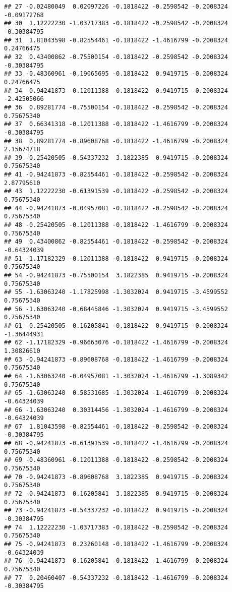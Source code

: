 \documentclass[
]{article}
\begin{document}
\begin{verbatim}
## 27 -0.02480049  0.02097226 -0.1818422 -0.2598542 -0.2008324 -0.09172768
## 30  1.12222230 -1.03717383 -0.1818422 -0.2598542 -0.2008324 -0.30384795
## 31  1.81043598 -0.82554461 -0.1818422 -1.4616799 -0.2008324  0.24766475
## 32  0.43400862 -0.75500154 -0.1818422 -0.2598542 -0.2008324 -0.30384795
## 33 -0.48360961 -0.19065695 -0.1818422  0.9419715 -0.2008324  0.24766475
## 34 -0.94241873 -0.12011388 -0.1818422  0.9419715 -0.2008324 -2.42505066
## 36  0.89281774 -0.75500154 -0.1818422 -0.2598542 -0.2008324  0.75675340
## 37  0.66341318 -0.12011388 -0.1818422 -1.4616799 -0.2008324 -0.30384795
## 38  0.89281774 -0.89608768 -0.1818422 -1.4616799 -0.2008324  2.15674718
## 39 -0.25420505 -0.54337232  3.1822385  0.9419715 -0.2008324  0.75675340
## 41 -0.94241873 -0.82554461 -0.1818422 -0.2598542 -0.2008324  2.87795610
## 43  1.12222230 -0.61391539 -0.1818422 -0.2598542 -0.2008324  0.75675340
## 44 -0.94241873 -0.04957081 -0.1818422 -0.2598542 -0.2008324  0.75675340
## 48 -0.25420505 -0.12011388 -0.1818422 -1.4616799 -0.2008324  0.75675340
## 49  0.43400862 -0.82554461 -0.1818422 -0.2598542 -0.2008324 -0.64324039
## 51 -1.17182329 -0.12011388 -0.1818422  0.9419715 -0.2008324  0.75675340
## 54 -0.94241873 -0.75500154  3.1822385  0.9419715 -0.2008324  0.75675340
## 55 -1.63063240 -1.17825998 -1.3032024  0.9419715 -3.4599552  0.75675340
## 56 -1.63063240 -0.68445846 -1.3032024  0.9419715 -3.4599552  0.75675340
## 61 -0.25420505  0.16205841 -0.1818422  0.9419715 -0.2008324 -1.36444931
## 62 -1.17182329 -0.96663076 -0.1818422 -1.4616799 -0.2008324  1.30826610
## 63 -0.94241873 -0.89608768 -0.1818422 -1.4616799 -0.2008324  0.75675340
## 64 -1.63063240 -0.04957081 -1.3032024 -1.4616799 -1.3089342  0.75675340
## 65 -1.63063240  0.58531685 -1.3032024 -1.4616799 -0.2008324 -0.64324039
## 66 -1.63063240  0.30314456 -1.3032024 -1.4616799 -0.2008324 -0.64324039
## 67  1.81043598 -0.82554461 -0.1818422 -0.2598542 -0.2008324 -0.30384795
## 68 -0.94241873 -0.61391539 -0.1818422 -1.4616799 -0.2008324  0.75675340
## 69 -0.48360961 -0.12011388 -0.1818422 -0.2598542 -0.2008324  0.75675340
## 70 -0.94241873 -0.89608768  3.1822385  0.9419715 -0.2008324  0.75675340
## 72 -0.94241873  0.16205841  3.1822385  0.9419715 -0.2008324  0.75675340
## 73 -0.94241873 -0.54337232 -0.1818422  0.9419715 -0.2008324 -0.30384795
## 74  1.12222230 -1.03717383 -0.1818422 -0.2598542 -0.2008324  0.75675340
## 75 -0.94241873  0.23260148 -0.1818422 -1.4616799 -0.2008324 -0.64324039
## 76 -0.94241873  0.16205841 -0.1818422 -1.4616799 -0.2008324  0.75675340
## 77  0.20460407 -0.54337232 -0.1818422 -1.4616799 -0.2008324 -0.30384795

\end{verbatim}
\end{document}
